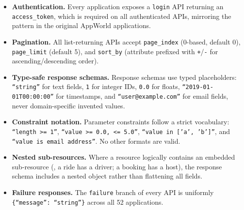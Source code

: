\begin{itemize}[leftmargin=1.5em, itemsep=2pt]
    \item \textbf{Authentication.} Every application exposes a \texttt{login} API returning an \texttt{access\_token}, which is required on all authenticated APIs, mirroring the pattern in the original AppWorld applications.
    \item \textbf{Pagination.} All list-returning APIs accept \texttt{page\_index} (0-based, default 0), \texttt{page\_limit} (default 5), and \texttt{sort\_by} (attribute prefixed with \texttt{+}/\texttt{-} for ascending/descending order).
    \item \textbf{Type-safe response schemas.} Response schemas use typed placeholders: \texttt{``string''} for text fields, \texttt{1} for integer IDs, \texttt{0.0} for floats, \texttt{``2019-01-01T00:00:00''} for timestamps, and \texttt{``user@example.com''} for email fields, never domain-specific invented values.
    \item \textbf{Constraint notation.} Parameter constraints follow a strict vocabulary: \texttt{``length >= 1''}, \texttt{``value >= 0.0, <= 5.0''}, \texttt{``value in ['a', 'b']''}, and \texttt{``value is email address''}. No other formats are valid.
    \item \textbf{Nested sub-resources.} Where a resource logically contains an embedded sub-resource (\eg, a ride has a driver; a booking has a host), the response schema includes a nested object rather than flattening all fields.
    \item \textbf{Failure responses.} The \texttt{failure} branch of every API is uniformly \texttt{\{``message'': ``string''\}} across all 52 applications.
\end{itemize}



